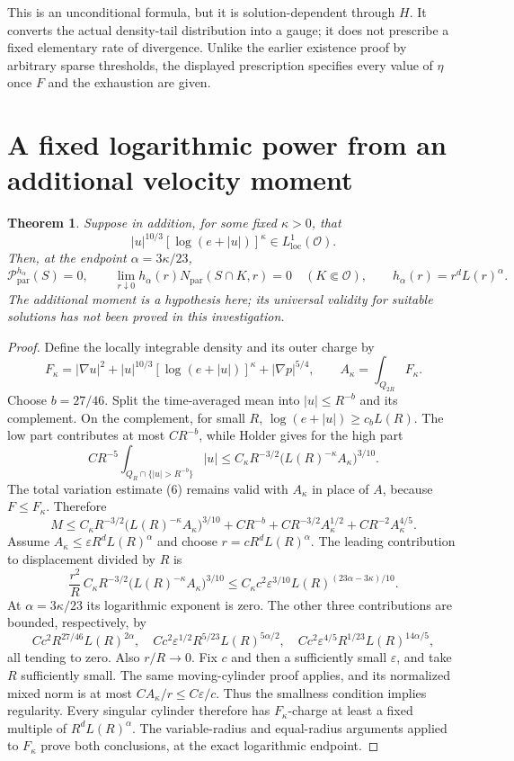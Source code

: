 \documentclass[11pt]{article}
\newtheorem{theorem}{Theorem}
\begin{document}
This is an unconditional formula, but it is solution-dependent through $H$. It converts the actual density-tail distribution into a gauge; it does not prescribe a fixed elementary rate of divergence. Unlike the earlier existence proof by arbitrary sparse thresholds, the displayed prescription specifies every value of $\eta$ once $F$ and the exhaustion are given.

\section{A fixed logarithmic power from an additional velocity moment}
\begin{theorem}
Suppose in addition, for some fixed $\kappa>0$, that
$$
|u|^{10/3}[\log(e+|u|)]^\kappa\in L^1_{\mathrm{loc}}(\mathcal O).
$$
Then, at the endpoint $\alpha=3\kappa/23$,
$$
\mathcal P^{h_\alpha}_{\mathrm{par}}(S)=0,
\qquad
\lim_{r\downarrow0}h_\alpha(r)N_{\mathrm{par}}(S\cap K,r)=0
\quad(K\Subset\mathcal O),
\qquad h_\alpha(r)=r^dL(r)^\alpha.
$$
The additional moment is a hypothesis here; its universal validity for suitable solutions has not been proved in this investigation.
\end{theorem}

\begin{proof}
Define the locally integrable density and its outer charge by
$$
F_\kappa=|\nabla u|^2
+|u|^{10/3}[\log(e+|u|)]^\kappa
+|\nabla p|^{5/4},
\qquad A_\kappa=\int_{Q_{2R}}F_\kappa.
$$
Choose $b=27/46$. Split the time-averaged mean into $|u|\le R^{-b}$ and its complement. On the complement, for small $R$, $\log(e+|u|)\ge c_bL(R)$. The low part contributes at most $CR^{-b}$, while Holder gives for the high part
$$
CR^{-5}\int_{Q_R\cap\{|u|>R^{-b}\}}|u|
\le C_\kappa R^{-3/2}
\bigl(L(R)^{-\kappa}A_\kappa\bigr)^{3/10}.
$$
The total variation estimate (6) remains valid with $A_\kappa$ in place of $A$, because $F\le F_\kappa$. Therefore
$$
M\le C_\kappa R^{-3/2}
\bigl(L(R)^{-\kappa}A_\kappa\bigr)^{3/10}
+CR^{-b}+C R^{-3/2}A_\kappa^{1/2}
+C R^{-2}A_\kappa^{4/5}.
$$
Assume $A_\kappa\le\varepsilon R^dL(R)^\alpha$ and choose $r=cR^dL(R)^\alpha$. The leading contribution to displacement divided by $R$ is
$$
\frac{r^2}{R}\,
C_\kappa R^{-3/2}
\bigl(L(R)^{-\kappa}A_\kappa\bigr)^{3/10}
\le C_\kappa c^2\varepsilon^{3/10}
L(R)^{(23\alpha-3\kappa)/10}.
$$
At $\alpha=3\kappa/23$ its logarithmic exponent is zero. The other three contributions are bounded, respectively, by
$$
Cc^2R^{27/46}L(R)^{2\alpha},\quad
Cc^2\varepsilon^{1/2}R^{5/23}L(R)^{5\alpha/2},\quad
Cc^2\varepsilon^{4/5}R^{1/23}L(R)^{14\alpha/5},
$$
all tending to zero. Also $r/R\to0$. Fix $c$ and then a sufficiently small $\varepsilon$, and take $R$ sufficiently small. The same moving-cylinder proof applies, and its normalized mixed norm is at most $C A_\kappa/r\le C\varepsilon/c$. Thus the smallness condition implies regularity. Every singular cylinder therefore has $F_\kappa$-charge at least a fixed multiple of $R^dL(R)^\alpha$. The variable-radius and equal-radius arguments applied to $F_\kappa$ prove both conclusions, at the exact logarithmic endpoint.
\end{proof}
\end{document}
